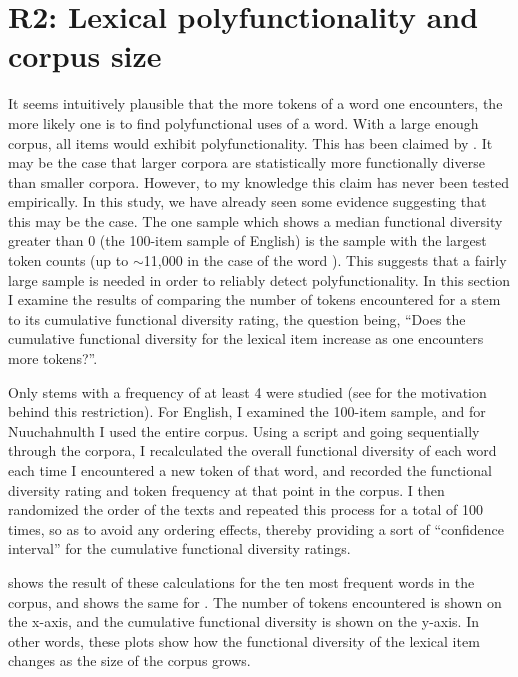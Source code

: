 \section{R2: Lexical polyfunctionality and corpus size}
\label{sec:4.4}

It seems intuitively plausible that the more tokens of a word one encounters, the more likely one is to find polyfunctional uses of a word. With a large enough corpus, all items would exhibit polyfunctionality. This has been claimed by \textcite[77]{MoselHovdhaugen1992}. It may be the case that larger corpora are statistically more functionally diverse than smaller corpora. However, to my knowledge this claim has never been tested empirically. In this study, we have already seen some evidence suggesting that this may be the case. The one sample which shows a median functional diversity greater than $0$ (the 100-item sample of English) is the sample with the largest token counts (up to $\sim$11,000 in the case of the word ). This suggests that a fairly large sample is needed in order to reliably detect polyfunctionality. In this section I examine the results of comparing the number of tokens encountered for a stem to its cumulative functional diversity rating, the question being, \enquote{Does the cumulative functional diversity for the lexical item increase as one encounters more tokens?}.

Only stems with a frequency of at least 4 were studied (see  for the motivation behind this restriction). For English, I examined the 100-item sample, and for Nuuchahnulth I used the entire corpus. Using a script and going sequentially through the corpora, I recalculated the overall functional diversity of each word each time I encountered a new token of that word, and recorded the functional diversity rating and token frequency at that point in the corpus. I then randomized the order of the texts and repeated this process for a total of 100 times, so as to avoid any ordering effects, thereby providing a sort of \enquote{confidence interval} for the cumulative functional diversity ratings.

 shows the result of these calculations for the ten most frequent words in the  corpus, and  shows the same for . The number of tokens encountered is shown on the x-axis, and the cumulative functional diversity is shown on the y-axis. In other words, these plots show how the functional diversity of the lexical item changes as the size of the corpus grows.

